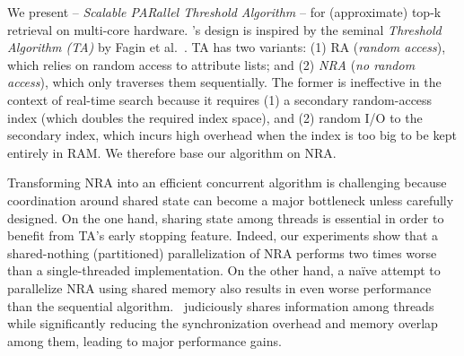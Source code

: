 We present \emph{\alg}  -- \emph{Scalable PARallel Threshold Algorithm} -- for (approximate)
top-k retrieval on multi-core hardware. 
%
\alg's design is inspired by the seminal \emph{Threshold Algorithm (TA)} by Fagin et al.~\cite{Fagin:2003}.  
TA has two variants: (1) RA (\emph{random access}), which  
 relies on random access to  attribute lists; 
and (2) {\em NRA} (\emph{no random access}),  which 
 only traverses them sequentially. The former is ineffective in the context of real-time search 
because it requires (1)  a secondary random-access index (which doubles the required index space), 
and (2) random I/O to the secondary index, which incurs high overhead when the index  is too big to be 
kept entirely in RAM. We therefore base our algorithm on  NRA. 



Transforming NRA into an efficient concurrent algorithm is challenging because coordination around 
shared state can become a major bottleneck unless carefully designed. On the one hand,
sharing state among threads is essential in order to benefit from TA's early stopping feature.
Indeed, our experiments show  that a shared-nothing (partitioned) parallelization of NRA performs two times 
worse than a single-threaded implementation. On the other hand, 
a na\"ive attempt to parallelize NRA using shared memory also results in even 
worse performance than the sequential algorithm. \alg\ judiciously shares 
information among threads while significantly reducing the synchronization 
overhead and memory overlap among them, 
leading to major performance gains. 

